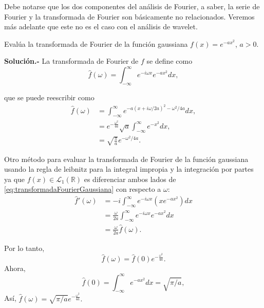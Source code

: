 \begin{multicols}{2}
\begin{tcolorbox}[colframe=white]
Debe notarse que los dos componentes del análisis de Fourier, a saber, la serie de Fourier y la transformada de Fourier son básicamente no relacionados. Veremos más adelante que este no es el caso con el análisis de wavelet.
\end{tcolorbox}

\vspace{0.5cm}

\begin{ejemplo}
    Evalúa la transformada de Fourier de la función gaussiana $f(x) = e^{-ax^2}$, $a > 0$.

    \textbf{Solución.-}\; La transformada de Fourier de $f$ se define como
    \begin{equation}
	\hat{f}(\omega) = \int_{-\infty}^{\infty} e^{-i\omega x} e^{-ax^2} dx,
	\label{eq:transformadaFourierGaussiana}
    \end{equation}

    que se puede reescribir como
    \begin{align*}
	\hat{f}(\omega) &= \int_{-\infty}^{\infty} e^{-a(x+ i\omega/2a)^2 - \omega^2/4a} dx, \\
	&= e^{-\frac{\omega^2}{4a}} \sqrt{a} \int_{-\infty}^{\infty} e^{-x^2} dx, \\
	&= \sqrt{\frac{\pi}{a}} e^{-\omega^2/4a}.
    \end{align*}

    Otro método para evaluar la transformada de Fourier de la función gaussiana usando la regla de leibnitz para la integral impropia y la integración por partes ya que  $f(x) \in \mathcal{L}_1(\mathbb{R})$  es diferenciar ambos lados de \ref{eq:transformadaFourierGaussiana} con respecto a $\omega$:
    \begin{align*}
	\hat{f}'(\omega) &= -i \int_{-\infty}^{\infty} e^{-i\omega x} (x e^{-ax^2}) dx \\
	&= \frac{\omega}{2a} \int_{-\infty}^{\infty} e^{-i\omega x} e^{-ax^2} dx \\
	&= \frac{\omega}{2a} \hat{f}(\omega).
    \end{align*}

    Por lo tanto, 
    $$\hat{f}(\omega) = \hat{f}(0) e^{-\frac{\omega^2}{4a}}.$$ 
    Ahora, 
    $$\hat{f}(0) = \int_{-\infty}^{\infty} e^{-ax^2} dx = \sqrt{\pi/a},$$ 
    Así, $\hat{f}(\omega) = \sqrt{\pi/a} e^{-\frac{\omega^2}{4a}}.$
    \label{ejemplo:1.2}
\end{ejemplo}


\end{multicols}
